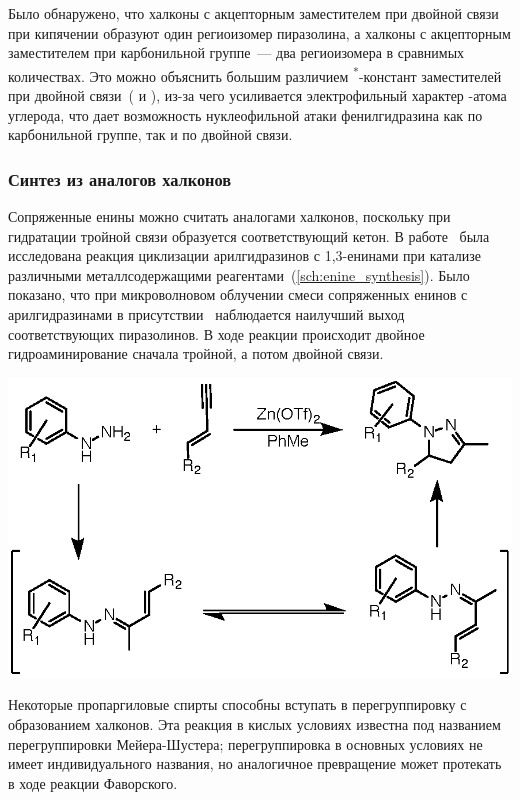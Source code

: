 Было обнаружено, что халконы с акцепторным заместителем при двойной связи при кипячении образуют один региоизомер пиразолина, а халконы с акцепторным заместителем при карбонильной группе~--- два региоизомера в сравнимых количествах.
Это можно объяснить большим различием \chemsigma\textsuperscript{*}-констант заместителей при двойной связи~( и ), из-за чего усиливается электрофильный характер \chembeta-атома углерода, что дает возможность нуклеофильной атаки фенилгидразина как по карбонильной группе, так и по двойной связи.
\FloatBarrier{}

\subsubsection{Синтез из аналогов халконов}
Сопряженные енины можно считать аналогами халконов, поскольку при гидратации тройной связи образуется соответствующий кетон.
В работе~\cite{Patil2011} была исследована реакция циклизации арилгидразинов с 1,3-енинами при катализе различными металлсодержащими реагентами~(\ref{sch:enine_synthesis}).
Было показано, что при микроволновом облучении смеси сопряженных енинов с арилгидразинами в присутствии~ наблюдается наилучший выход соответствующих пиразолинов.
В ходе реакции происходит двойное гидроаминирование сначала тройной, а потом двойной связи.

\begin{scheme}[h!]
    \centering
    \includegraphics{sections/literature/img/enine_synthesis.eps}
    \caption{}
    \label{sch:enine_synthesis}
\end{scheme}

Некоторые пропаргиловые спирты способны вступать в перегруппировку с образованием халконов.
Эта реакция в кислых условиях известна под названием перегруппировки Мейера-Шустера; перегруппировка в основных условиях не имеет индивидуального названия, но аналогичное превращение может протекать в ходе реакции Фаворского.

